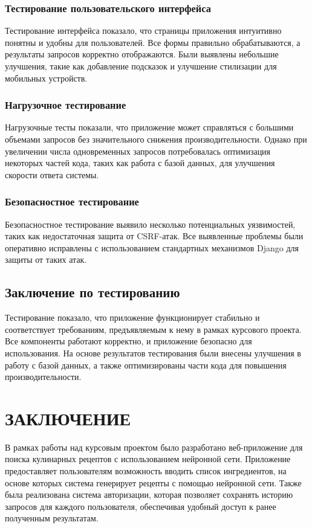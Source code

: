 {\subsubsection*{Тестирование пользовательского интерфейса}
Тестирование интерфейса показало, что страницы приложения интуитивно понятны и удобны для пользователей. Все формы правильно обрабатываются, а результаты запросов корректно отображаются. Были выявлены небольшие улучшения, такие как добавление подсказок и улучшение стилизации для мобильных устройств.

\subsubsection*{Нагрузочное тестирование}
Нагрузочные тесты показали, что приложение может справляться с большими объемами запросов без значительного снижения производительности. Однако при увеличении числа одновременных запросов потребовалась оптимизация некоторых частей кода, таких как работа с базой данных, для улучшения скорости ответа системы.

\subsubsection*{Безопасностное тестирование}
Безопасностное тестирование выявило несколько потенциальных уязвимостей, таких как недостаточная защита от CSRF-атак. Все выявленные проблемы были оперативно исправлены с использованием стандартных механизмов Django для защиты от таких атак.

\subsection{Заключение по тестированию}

Тестирование показало, что приложение функционирует стабильно и соответствует требованиям, предъявляемым к нему в рамках курсового проекта. Все компоненты работают корректно, и приложение безопасно для использования. На основе результатов тестирования были внесены улучшения в работу с базой данных, а также оптимизированы части кода для повышения производительности.

\newpage

\section*{\MakeUppercase{Заключение}}
{
    В рамках работы над курсовым проектом было разработано веб-приложение для поиска кулинарных рецептов с использованием нейронной сети. Приложение предоставляет пользователям возможность вводить список ингредиентов, на основе которых система генерирует рецепты с помощью нейронной сети. Также была реализована система авторизации, которая позволяет сохранять историю запросов для каждого пользователя, обеспечивая удобный доступ к ранее полученным результатам.

}}
